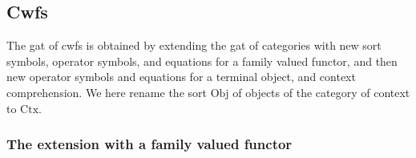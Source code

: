 \documentclass{lmcs}
\def\Obj{\mathrm{Obj}}
\def\Ctx{\mathrm{Ctx}}
\def\Hom{\mathrm{Hom}}
\def\id{\mathrm{id}}
\begin{document}

\subsection{Cwfs}

The gat of cwfs is obtained by extending the gat of categories with new sort symbols, operator symbols, and equations for a family valued functor, and then new operator symbols and equations for a terminal object, and context comprehension. We here rename the sort $\Obj$ of objects of the category of context to $\Ctx$.

\subsubsection{The extension with a family valued functor}
\mbox{ }
\end{document}
